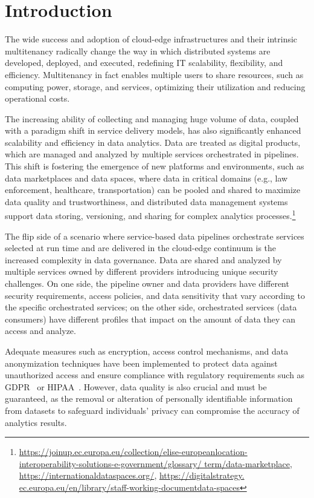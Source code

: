 \section{Introduction}
{\color{OurColor}The wide success and adoption of cloud-edge infrastructures and their intrinsic multitenancy radically change the way in which distributed systems are developed, deployed, and executed, redefining IT scalability, flexibility, and efficiency.} Multitenancy in fact enables multiple users to share resources, such as computing power, storage, and services, optimizing their utilization and reducing operational costs.

{\color{OurColor}The increasing ability of collecting and managing huge volume of data, coupled with a paradigm shift in service delivery models, has also significantly enhanced scalability and efficiency in data analytics. Data are treated as digital products, which are managed and analyzed by multiple services orchestrated in pipelines. This shift is fostering the emergence of new platforms and environments, such as data marketplaces and data spaces, where data in critical domains (e.g., law enforcement, healthcare, transportation) can be pooled and shared to maximize data quality and trustworthiness,
and distributed data management systems support data storing, versioning, and sharing for complex analytics processes.}\footnote{\url{https://joinup.ec.europa.eu/collection/elise-europeanlocation-
interoperability-solutions-e-government/glossary/
term/data-marketplace}, \url{https://internationaldataspaces.org/}, \url{https://digitalstrategy.
ec.europa.eu/en/library/staff-working-documentdata-spaces}}

The flip side of a scenario {\color{OurColor}where service-based data pipelines orchestrate services selected at run time and are delivered in the cloud-edge continuum} is the increased complexity in data governance. {\color{OurColor}Data are shared and analyzed by multiple services owned by different providers introducing unique security challenges. On one side, the pipeline owner and data providers have different security requirements, access policies, and data sensitivity that vary according to the specific orchestrated services; on the other side, orchestrated services (data consumers) have different profiles that impact on the amount of data they can access and analyze.}

Adequate measures such as encryption, access control mechanisms, and data anonymization techniques  have been implemented to protect data against unauthorized access and ensure compliance with regulatory requirements such as GDPR~\cite{EuropeanParliament2016a} or HIPAA~\cite{hipaa1996}. {\color{OurColor}However, data quality is also crucial and must be guaranteed, as the removal or alteration of personally identifiable information from datasets to safeguard individuals' privacy can compromise the accuracy of analytics results.}

